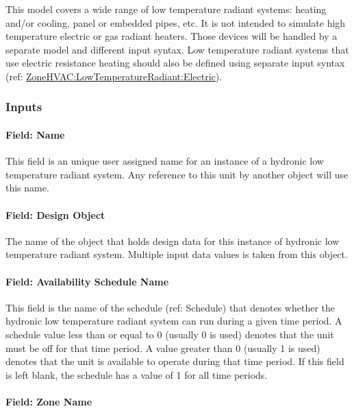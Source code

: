 This model covers a wide range of low temperature radiant systems: heating and/or cooling, panel or embedded pipes, etc. It is not intended to simulate high temperature electric or gas radiant heaters. Those devices will be handled by a separate model and different input syntax. Low temperature radiant systems that use electric resistance heating should also be defined using separate input syntax (ref: \hyperref[zonehvaclowtemperatureradiantelectric]{ZoneHVAC:LowTemperatureRadiant:Electric}).

\subsubsection{Inputs}\label{inputs-5-022}

\paragraph{Field: Name}\label{field-name-5-018}

This field is an unique user assigned name for an instance of a hydronic low temperature radiant system. Any reference to this unit by another object will use this name.

\paragraph{Field: Design Object}\label{Varflow_DesignObjectName}

The name of the object that holds design data for this instance of hydronic low temperature radiant system. Multiple input data values is taken from this object.

\paragraph{Field: Availability Schedule Name}\label{field-availability-schedule-name-5-003}

This field is the name of the schedule (ref: Schedule) that denotes whether the hydronic low temperature radiant system can run during a given time period. A schedule value less than or equal to 0 (usually 0 is used) denotes that the unit must be off for that time period. A value greater than 0 (usually 1 is used) denotes that the unit is available to operate during that time period. If this field is left blank, the schedule has a value of 1 for all time periods.

\paragraph{Field: Zone Name}\label{field-zone-name-009}

